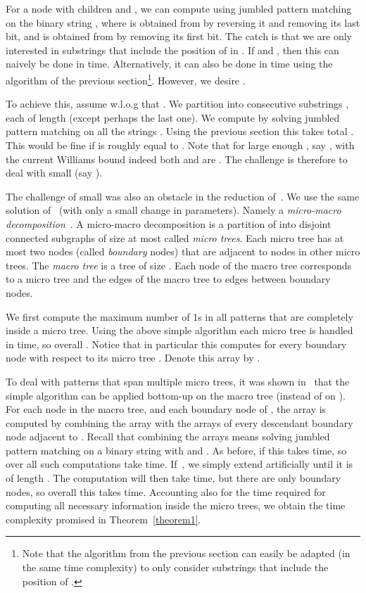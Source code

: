 \documentclass[11pt]{llncs}
\begin{document}
For a node  with children  and , we can compute  using jumbled pattern matching on the binary string , where  is obtained from  by reversing it and removing its last bit, and  is obtained from  by removing its first bit. The catch is that we are only interested in substrings that include the position of  in . If  and , then this can naively be done in  time. Alternatively, it can also be done in  time using the algorithm of the previous section\footnote{Note that the algorithm from the previous section can easily be adapted (in the same time complexity) to only consider substrings that include the position of .}. However, we desire .

To achieve this, assume w.l.o.g that . We partition  into consecutive substrings , each of length  (except perhaps the last one). We compute  by solving jumbled pattern matching on all the strings  . Using the previous section this takes total . This would be fine if  is roughly equal to . Note that for large enough , say , with the current Williams bound  indeed both  and  are .  The challenge is therefore  to deal with small  (say ).

The challenge of small  was also an obstacle in the reduction of~\cite{OurESA13}.
We use the same solution of~\cite{OurESA13} (with only a small change in parameters). Namely a \emph{micro-macro decomposition}~\cite{MicroMacro}.
A micro-macro decomposition is a partition of  into
 disjoint connected subgraphs of size at most  called {\em micro trees}. Each micro tree  has at most two nodes (called \emph{boundary} nodes) that are adjacent to nodes in other micro trees. The {\em macro tree}  is a tree of size . Each node of the macro tree corresponds to a micro tree  and the edges of the macro tree  to edges between boundary nodes.



We first compute the maximum number of 1s in all patterns that are completely inside a micro tree. Using the above simple algorithm each micro tree is handled in  time, so overall . Notice that in particular this computes  for every boundary node  with respect to its micro tree . Denote this array by .

To deal with patterns that span multiple micro trees, it was shown in~\cite{OurESA13} that the simple algorithm can be applied bottom-up on the macro tree (instead of on ). For each node  in the macro tree, and each boundary node  of , the array  is computed by combining the array  with the arrays  of every descendant boundary node  adjacent to . Recall that combining the arrays means solving jumbled pattern matching on a binary string  with  and . As before, if  this takes  time, so over all such computations take  time. If~, we simply extend  artificially until it is of length . The computation will then take  time, but there are only  boundary nodes, so overall this takes  time. Accounting also for the  time required for computing all necessary information inside the micro trees, we obtain the time complexity promised in Theorem~\ref{theorem1}.
\end{document}
